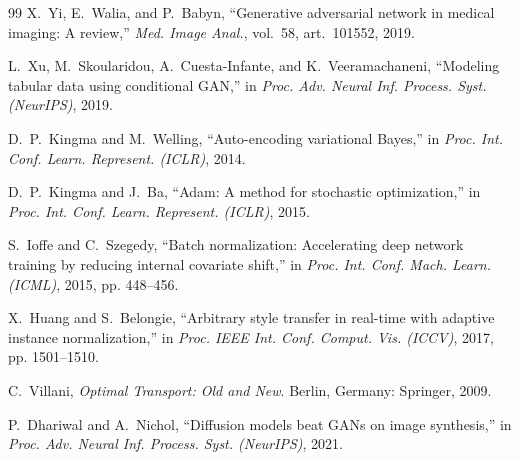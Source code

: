 \documentclass[conference]{IEEEtran}
\theoremstyle{plain}
\theoremstyle{definition}
\begin{document}
\begin{thebibliography}{99}
 X.~Yi, E.~Walia, and P.~Babyn, ``Generative adversarial network in medical imaging: A review,'' \emph{Med. Image Anal.}, vol.~58, art.~101552, 2019.

 L.~Xu, M.~Skoularidou, A.~Cuesta-Infante, and K.~Veeramachaneni, ``Modeling tabular data using conditional GAN,'' in \emph{Proc. Adv. Neural Inf. Process. Syst. (NeurIPS)}, 2019.

 D.~P.~Kingma and M.~Welling, ``Auto-encoding variational Bayes,'' in \emph{Proc. Int. Conf. Learn. Represent. (ICLR)}, 2014.

 D.~P.~Kingma and J.~Ba, ``Adam: A method for stochastic optimization,'' in \emph{Proc. Int. Conf. Learn. Represent. (ICLR)}, 2015.

 S.~Ioffe and C.~Szegedy, ``Batch normalization: Accelerating deep network training by reducing internal covariate shift,'' in \emph{Proc. Int. Conf. Mach. Learn. (ICML)}, 2015, pp. 448--456.

 X.~Huang and S.~Belongie, ``Arbitrary style transfer in real-time with adaptive instance normalization,'' in \emph{Proc. IEEE Int. Conf. Comput. Vis. (ICCV)}, 2017, pp. 1501--1510.

 C.~Villani, \emph{Optimal Transport: Old and New}. Berlin, Germany: Springer, 2009.

 P.~Dhariwal and A.~Nichol, ``Diffusion models beat GANs on image synthesis,'' in \emph{Proc. Adv. Neural Inf. Process. Syst. (NeurIPS)}, 2021.

\end{thebibliography}
\end{document}
